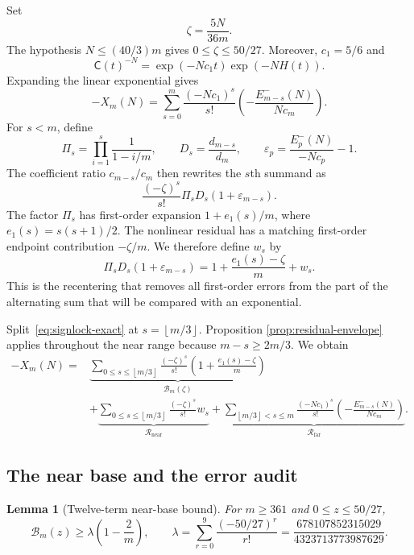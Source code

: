 \documentclass[11pt]{article}
\newtheorem{lemma}[theorem]{Lemma}
\theoremstyle{definition}
\theoremstyle{remark}
\newcommand{\C}{\mathsf C}
\newcommand{\floor}[1]{\left\lfloor #1\right\rfloor}
\begin{document}
Set
\[
  \zeta=\frac{5N}{36m}.
\]
The hypothesis $N\le(40/3)m$ gives $0\le\zeta\le50/27$.  Moreover,
$c_1=5/6$ and
\[
 \C(t)^{-N}=\exp(-Nc_1t)\exp(-NH(t)).
\]
Expanding the linear exponential gives
\begin{equation}\label{eq:signlock-exact}
  -X_m(N)=\sum_{s=0}^{m}\frac{(-Nc_1)^s}{s!}
           \left(-\frac{E^-_{m-s}(N)}{Nc_m}\right).
\end{equation}
For $s<m$, define
\[
  \Pi_s=\prod_{i=1}^{s}\frac1{1-i/m},
  \qquad D_s=\frac{d_{m-s}}{d_m},
  \qquad
  \varepsilon_p=\frac{E^-_p(N)}{-Nc_p}-1.
\]
The coefficient ratio $c_{m-s}/c_m$ then rewrites the $s$th summand as
\begin{equation}\label{eq:signlock-summand}
  \frac{(-\zeta)^s}{s!}\Pi_sD_s(1+\varepsilon_{m-s}).
\end{equation}
The factor $\Pi_s$ has first-order expansion
$1+e_1(s)/m$, where $e_1(s)=s(s+1)/2$.  The nonlinear residual has a matching
first-order endpoint contribution $-\zeta/m$.  We therefore define $w_s$ by
\begin{equation}\label{eq:ws-def}
 \Pi_sD_s(1+\varepsilon_{m-s})
  =1+\frac{e_1(s)-\zeta}{m}+w_s.
\end{equation}
This is the recentering that removes all first-order errors from the part of
the alternating sum that will be compared with an exponential.

Split~\eqref{eq:signlock-exact} at $s=\floor{m/3}$.  Proposition
\ref{prop:residual-envelope} applies throughout the near range because
$m-s\ge2m/3$.  We obtain
\begin{equation}\label{eq:signlock-three}
\begin{aligned}
 -X_m(N)={}&
 \underbrace{\sum_{0\le s\le\floor{m/3}}
   \frac{(-\zeta)^s}{s!}
   \left(1+\frac{e_1(s)-\zeta}{m}\right)}_{\mathcal B_m(\zeta)}\\
 &+\underbrace{\sum_{0\le s\le\floor{m/3}}
   \frac{(-\zeta)^s}{s!}w_s}_{\mathcal R_{\mathrm{near}}}
 +\underbrace{\sum_{\floor{m/3}<s\le m}
   \frac{(-Nc_1)^s}{s!}
   \left(-\frac{E^-_{m-s}(N)}{Nc_m}\right)}_{\mathcal R_{\mathrm{far}}}.
\end{aligned}
\end{equation}

\subsection{The near base and the error audit}

\begin{lemma}[Twelve-term near-base bound]\label{lem:near-base}
For $m\ge361$ and $0\le z\le50/27$,
\begin{equation}\label{eq:near-base-bound}
  \mathcal B_m(z)\ge\lambda\left(1-\frac2m\right),
  \qquad
  \lambda=\sum_{r=0}^{9}\frac{(-50/27)^r}{r!}
  =\frac{678107852315029}{4323713773987629}.
\end{equation}
\end{lemma}
\end{document}
